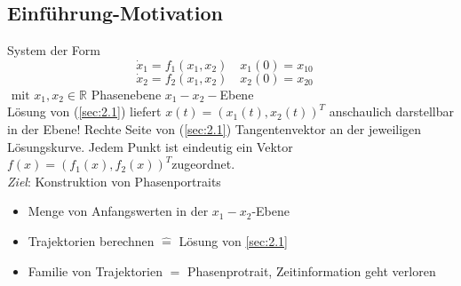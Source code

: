 \documentclass[11pt,a4paper]{article}
\begin{document}
\subsection{Einführung-Motivation}
System der Form\\
\begin{equation}
\dot x_1 =f_1(x_1,x_2) \quad x_1(0)=x_{10} \quad \tag{2.1a}
\end{equation}
\begin{equation}
\dot x_2 = f_2(x_1,x_2) \quad x_2(0)=x_{20} \quad \tag{2.1b}
\end{equation}
\label{sec:2.1}
$
\text{ mit } x_1, x_2 \in \mathbb{R}$ Phasenebene $x_1 - x_2-$Ebene
\\Lösung von (\ref{sec:2.1}) liefert $x(t) = (x_1(t), x_2(t))^T$ anschaulich darstellbar in der Ebene!
Rechte Seite von (\ref{sec:2.1}) Tangentenvektor an der jeweiligen Lösungskurve. Jedem Punkt ist eindeutig ein Vektor $f(x) = (f_1(x), f_2(x))^T$zugeordnet.\\
\textit{Ziel}: Konstruktion von Phasenportraits
\begin{itemize}
\item Menge von Anfangswerten in der $x_1 - x_2$-Ebene
\item Trajektorien berechnen $\hat{=}$ Lösung von \ref{sec:2.1}
\item Familie von Trajektorien $=$ Phasenprotrait, Zeitinformation geht verloren
\begin{figure}[H]  
  \centering
  \def\svgwidth{220pt} 
   
\end{figure} 
\end{itemize}
\end{document}
